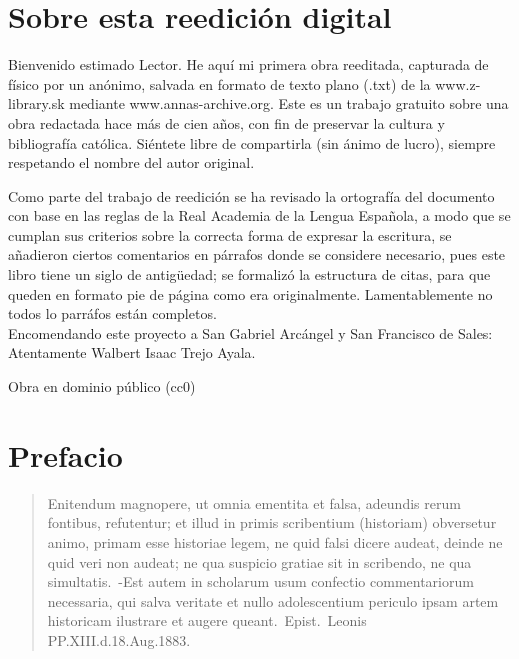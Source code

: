 \raggedbottom{} \documentclass[12pt, a4paper, openany]{book} %
\begin{document}
\section{Sobre esta reedición digital} %
Bienvenido estimado Lector. He aquí mi primera obra reeditada, capturada de físico por un anónimo, salvada en formato de texto plano (.txt) de la www.z-library.sk mediante www.annas-archive.org\@. Este es un trabajo gratuito sobre una obra redactada hace más de cien años, con fin de preservar la cultura y bibliografía católica. Siéntete libre de compartirla (sin ánimo de lucro), siempre respetando el nombre del autor original.

Como parte del trabajo de reedición se ha revisado la ortografía del documento con base en las reglas de la Real Academia de la Lengua Española, a modo que se cumplan sus criterios sobre la correcta forma de expresar la escritura, se añadieron ciertos comentarios en párrafos donde se considere necesario, pues este libro tiene un siglo de antigüedad; se formalizó la estructura de citas, para que queden en formato pie de página como era originalmente. Lamentablemente no todos lo parráfos están completos.\\
Encomendando este proyecto a San Gabriel Arcángel y San Francisco de Sales: Atentamente Walbert Isaac Trejo Ayala.

Obra en dominio público (cc0)
\section{Prefacio}
\begin{quotation}
  Enitendum magnopere, ut omnia ementita et falsa, adeundis rerum fontibus, refutentur; et illud in primis scribentium (historiam) obversetur animo, primam esse historiae legem, ne quid falsi dicere audeat, deinde ne quid veri non audeat; ne qua suspicio gratiae sit in scribendo, ne qua simultatis.\ -Est autem in scholarum usum confectio commentariorum necessaria, qui salva veritate et nullo adolescentium periculo ipsam artem historicam ilustrare et augere queant.\ Epist.\ Leonis PP.\@ XIII.\@ d.\@ 18.\@ Aug.\@ 1883.
\end{quotation}
\end{document}
